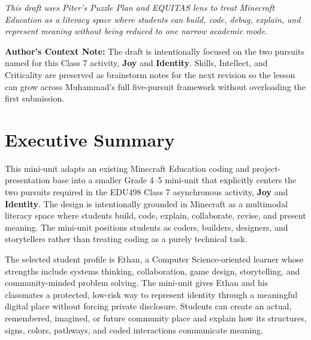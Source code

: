 \documentclass[11pt]{article}
\begin{document}
\begin{titlepage}
\vspace{0.34in}

\begin{center}
\begin{minipage}{0.86\textwidth}
\itshape
This draft uses Piter's Puzzle Plan and EQUITAS lens to treat Minecraft Education as a literacy space where students can build, code, debug, explain, and represent meaning without being reduced to one narrow academic mode.

\vspace{0.22in}

\tiny\centering\textbf{Author's Context Note:} The draft is intentionally focused on the two pursuits named for this Class 7 activity, \textbf{Joy} and \textbf{Identity}. Skills, Intellect, and Criticality are preserved as brainstorm notes for the next revision so the lesson can grow across Muhammad's full five-pursuit framework without overloading the first submission.
\end{minipage}
\end{center}

\restoregeometry
\end{titlepage}
\clearpage

\section*{Executive Summary}

This mini-unit adapts an existing Minecraft Education coding and project-presentation base into a smaller Grade 4--5 mini-unit that explicitly centers the two pursuits required in the EDU498 Class 7 asynchronous activity, \textbf{Joy} and \textbf{Identity}. The design is intentionally grounded in Minecraft as a multimodal literacy space where students build, code, explain, collaborate, revise, and present meaning. The mini-unit positions students as coders, builders, designers, and storytellers rather than treating coding as a purely technical task.

The selected student profile is Ethan, a Computer Science-oriented learner whose strengths include systems thinking, collaboration, game design, storytelling, and community-minded problem solving. The mini-unit gives Ethan and his classmates a protected, low-risk way to represent identity through a meaningful digital place without forcing private disclosure. Students can create an actual, remembered, imagined, or future community place and explain how its structures, signs, colors, pathways, and coded interactions communicate meaning.
\end{document}
